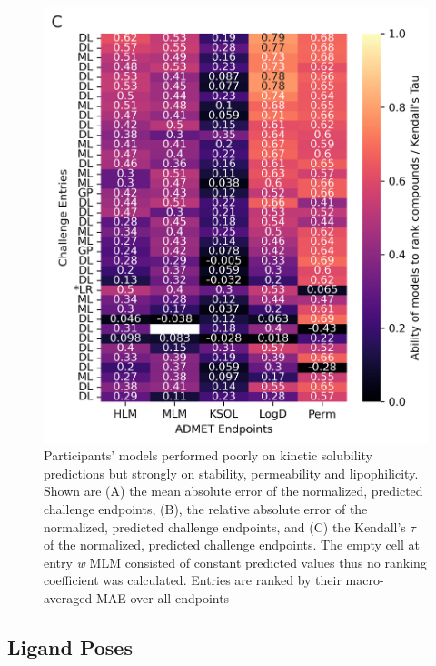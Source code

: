 \documentclass[journal=jcim,manuscript=article]{achemso}
\begin{document}
\begin{figure}
    \includegraphics[scale=0.6]{04_figs_leaderboards/ktau.png}
  \caption{Participants' models performed poorly on kinetic solubility predictions but strongly on stability, permeability and lipophilicity. Shown are (A) the mean absolute error of the normalized, predicted challenge endpoints, (B), the relative absolute error of the normalized, predicted challenge endpoints, and (C) the Kendall's $\tau$ of the normalized, predicted challenge endpoints. The empty cell at entry \textit{w} MLM consisted of constant predicted values thus no ranking coefficient was calculated. Entries are ranked by their macro-averaged MAE over all endpoints}
  \label{fgr:heatmaps_admet}
\end{figure}

\subsection{Ligand Poses}
\end{document}
